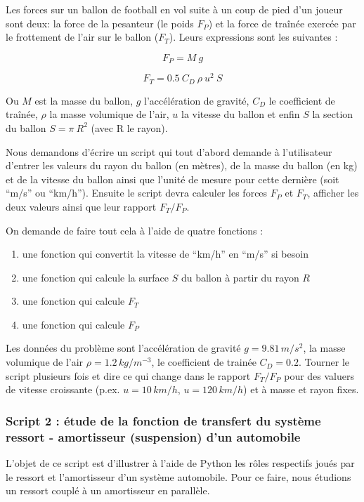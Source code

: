 \documentclass{article}
\begin{document}
    Les forces sur un ballon de football en vol suite à un coup de pied d'un
joueur sont deux: la force de la pesanteur (le poids \(F_P\)) et la
force de traînée exercée par le frottement de l'air sur le ballon
(\(F_T\)). Leurs expressions sont les suivantes :

    \[F_P = M\ g\]

\[F_T = 0.5 \ C_D \ \rho \ u^2\ S \]

    Ou \(M\) est la masse du ballon, \(g\) l'accélération de gravité,
\(C_D\) le coefficient de traînée, \(\rho\) la masse volumique de l'air,
\(u\) la vitesse du ballon et enfin \(S\) la section du ballon
\(S=\pi\ R^2\) (avec R le rayon).

    Nous demandons d'écrire un script qui tout d'abord demande à
l'utilisateur d'entrer les valeurs du rayon du ballon (en mètres), de la
masse du ballon (en kg) et de la vitesse du ballon ainsi que l'unité de
mesure pour cette dernière (soit ``m/s'' ou ``km/h''). Ensuite le script
devra calculer les forces \(F_P\) et \(F_T\), afficher les deux valeurs
ainsi que leur rapport \(F_T/F_P\).

    On demande de faire tout cela à l'aide de quatre fonctions :

\begin{enumerate}
\def\labelenumi{\arabic{enumi})}
\item
  une fonction qui convertit la vitesse de ``km/h'' en ``m/s'' si besoin
\item
  une fonction qui calcule la surface \(S\) du ballon à partir du rayon
  \(R\)
\item
  une fonction qui calcule \(F_T\)
\item
  une fonction qui calcule \(F_P\)
\end{enumerate}

    Les données du problème sont l'accélération de gravité
\(g=9.81 \, m /s^2\), la masse volumique de l'air
\(\rho = 1.2 \, kg/m^{-3}\), le coefficient de trainée \(C_D=0.2\).
Tourner le script plusieurs fois et dire ce qui change dans le rapport
\(F_T/F_P\) pour des valuers de vitesse croissante (p.ex.
\(u=10 \, km/h\), \(u=120 \, km/h\)) et à masse et rayon fixes.


    \subsubsection{Script 2 : étude de la fonction de transfert du système ressort -
amortisseur (suspension) d'un automobile}


    L'objet de ce script est d'illustrer à l'aide de Python les rôles
respectifs joués par le ressort et l'amortisseur d'un système
automobile. Pour ce faire, nous étudions un ressort couplé à un
amortisseur en parallèle.
\end{document}
